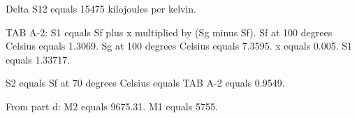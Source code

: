 Delta S12 equals 15475 kilojoules per kelvin.  

TAB A-2:  
S1 equals Sf plus x multiplied by (Sg minus Sf).  
Sf at 100 degrees Celsius equals 1.3069.  
Sg at 100 degrees Celsius equals 7.3595.  
x equals 0.005.  
S1 equals 1.33717.  

S2 equals Sf at 70 degrees Celsius equals TAB A-2 equals 0.9549.  

From part d:  
M2 equals 9675.31.  
M1 equals 5755.